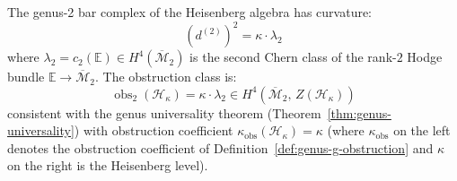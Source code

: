 \begin{theorem}\label{thm:heisenberg-genus2-obstruction}
The genus-2 bar complex of the Heisenberg algebra has curvature:
\begin{equation}\label{eq:heisenberg-genus2-curvature}
(d^{(2)})^2 = \kappa \cdot \lambda_2
\end{equation}
where $\lambda_2 = c_2(\mathbb{E}) \in H^4(\overline{\mathcal{M}}_2)$ is the second Chern class of the rank-$2$ Hodge bundle $\mathbb{E} \to \overline{\mathcal{M}}_2$.  The obstruction class is:
\begin{equation}
\operatorname{obs}_2(\mathcal{H}_\kappa) = \kappa \cdot \lambda_2 \in H^4(\overline{\mathcal{M}}_2,\, Z(\mathcal{H}_\kappa))
\end{equation}
consistent with the genus universality theorem (Theorem~\ref{thm:genus-universality}) with obstruction coefficient $\kappa_{\mathrm{obs}}(\mathcal{H}_\kappa) = \kappa$ (where $\kappa_{\mathrm{obs}}$ on the left denotes the obstruction coefficient of Definition~\ref{def:genus-g-obstruction} and $\kappa$ on the right is the Heisenberg level).
\end{theorem}

